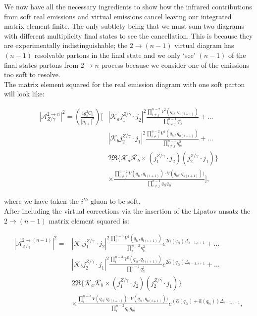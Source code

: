 		We now have all the necessary ingredients to show how the infrared contributions from
		soft real emissions and virtual emissions cancel leaving our integrated matrix element
		finite.  The only subtlety being that we must sum two diagrams with different multiplicity
		final states to see the cancellation.  This is because they are experimentally indistinguishable;
		the $2\rightarrow (n-1)$ virtual diagram has $(n-1)$ resolvable partons in the final state
		and we only `see' $(n-1)$ of the final states partons from $2\rightarrow n$ process because
		we consider one of the emissions too soft to resolve.\\
		The matrix element squared for the real emission diagram with one soft parton
		will look like:

		\begin{align}
			|\mathcal{A}_{Z/\gamma}^{2\rightarrow n}|^2 = \left(\frac{4g_s^2C_a}{|p_{i\perp}|^2}\right)
				\Bigg[&\left|\mathcal{K}_a j_1^{Z/\gamma}\cdot j_2\right|^2
				\frac{\prod^{n-2}_{i\neq j}V^2(q_{ti},
				q_{t(i+1)})}{\prod^{n-1}_{i\neq j}q^2_{ti}} + \ldots \\
				&\left|\mathcal{K}_b j_2^{Z/\gamma}\cdot j_1\right|^2
				\frac{\prod^{n-2}_{i\neq j}V^2(q_{bi}, q_{b(i+1)})}{\prod^{n-1}_{i\neq j}q^2_{bi}} + \ldots \\
				&2\Re\{\mathcal{K}_a\overline{\mathcal{K}_b} \times
				(j_1^{Z/\gamma}\cdot j_2)(\overline{j_2^{Z/\gamma}\cdot j_1})\}\\
				&\times\frac{\prod^{n-2}_{i\neq j}V(q_{ti}, q_{t(i+1)})\cdot V(q_{bi}, q_{b(i+1)}))}
				{\prod^{n-1}_{i\neq j}q_{ti}q_{bi}}\Bigg],
		\end{align}

		where we have taken the $i^{th}$ gluon to be soft.\\After including the virtual corrections
		via the insertion of the Lipatov ansatz the $2\rightarrow (n-1)$ matrix element squared is:

		\begin{align}
			|\mathcal{A}_{Z/\gamma}^{2\rightarrow (n-1)}|^2 = &\left|\mathcal{K}_a j_1^{Z/\gamma}\cdot j_2\right|^2
				\frac{\prod^{n-3}_{i}V^2(q_{ti}, q_{t(i+1)})}{\prod^{n-2}_{i}q^2_{ti}}e^{2\hat{\alpha}(q_{ti})\Delta_{i-1,i+1}} + \ldots \\
				&\left|\mathcal{K}_b j_2^{Z/\gamma}\cdot j_1\right|^2 \frac{\prod^{n-3}_{i}V^2(q_{bi}, q_{b(i+1)})}
				{\prod^{n-2}_{i}q^2_{bi}}e^{2\hat{\alpha}(q_{bi})\Delta_{i-1,i+1}} + \ldots \\
				&2\Re\{\mathcal{K}_a\overline{\mathcal{K}_b} \times (j_1^{Z/\gamma}\cdot j_2)(\overline{j_2^{Z/\gamma}\cdot j_1})\}\\
				&\times\frac{\prod^{n-3}_{i}V(q_{ti}, q_{t(i+1)})\cdot V(q_{bi}, q_{b(i+1)}))}{\prod^{n-2}_{i}q_{ti}q_{bi}}
				e^{(\hat{\alpha}(q_{bi}) + \hat{\alpha}(q_{bi}))\Delta_{i-1,i+1}},
		\end{align}

